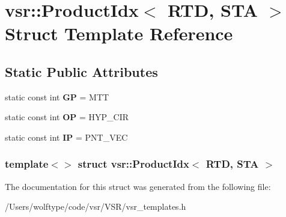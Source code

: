 \hypertarget{structvsr_1_1_product_idx_3_01_r_t_d_00_01_s_t_a_01_4}{\section{vsr\-:\-:Product\-Idx$<$ R\-T\-D, S\-T\-A $>$ Struct Template Reference}
\label{structvsr_1_1_product_idx_3_01_r_t_d_00_01_s_t_a_01_4}
}
\subsection*{Static Public Attributes}
\begin{DoxyCompactItemize}
\item 
\hypertarget{structvsr_1_1_product_idx_3_01_r_t_d_00_01_s_t_a_01_4_a6eb5e676600262e286cceadcd94edd9e}{static const int {\bfseries G\-P} = M\-T\-T}\label{structvsr_1_1_product_idx_3_01_r_t_d_00_01_s_t_a_01_4_a6eb5e676600262e286cceadcd94edd9e}

\item 
\hypertarget{structvsr_1_1_product_idx_3_01_r_t_d_00_01_s_t_a_01_4_a5fcce9166bf67cd03fd5e98325956e22}{static const int {\bfseries O\-P} = H\-Y\-P\-\_\-\-C\-I\-R}\label{structvsr_1_1_product_idx_3_01_r_t_d_00_01_s_t_a_01_4_a5fcce9166bf67cd03fd5e98325956e22}

\item 
\hypertarget{structvsr_1_1_product_idx_3_01_r_t_d_00_01_s_t_a_01_4_a012cb2fa135c0ebf2cc851ca7122df1c}{static const int {\bfseries I\-P} = P\-N\-T\-\_\-\-V\-E\-C}\label{structvsr_1_1_product_idx_3_01_r_t_d_00_01_s_t_a_01_4_a012cb2fa135c0ebf2cc851ca7122df1c}

\end{DoxyCompactItemize}
\subsubsection*{template$<$$>$ struct vsr\-::\-Product\-Idx$<$ R\-T\-D, S\-T\-A $>$}



The documentation for this struct was generated from the following file\-:\begin{DoxyCompactItemize}
\item 
/\-Users/wolftype/code/vsr/\-V\-S\-R/vsr\-\_\-templates.\-h\end{DoxyCompactItemize}
